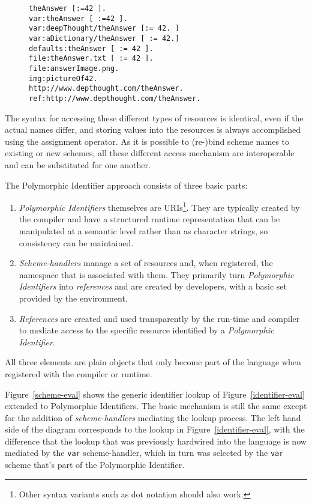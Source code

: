 \documentclass[preprint,authoryear]{llncs}
\begin{document}
\begin{figure}[htbp]
\begin{lstlisting}[style=numbers,label=polymorphic-identifier-examples,caption=Retrieve \mbox{[and store]} values via Polymorphic Identifiers.]
theAnswer [:=42 ].
var:theAnswer [ :=42 ].
var:deepThought/theAnswer [:= 42. ]
var:aDictionary/theAnswer [ := 42.]
defaults:theAnswer [ := 42 ].
file:theAnswer.txt [ := 42 ].
file:answerImage.png.
img:pictureOf42.
http://www.depthought.com/theAnswer.
ref:http://www.depthought.com/theAnswer.
\end{lstlisting}
\end{figure}

The syntax for accessing these different types of resources is identical, even if the actual
names differ, and storing values into the resources is always accomplished using the assignment operator.
As it is possible to (re-)bind scheme names to existing or new schemes, all these different access 
mechanism are interoperable and can be substituted for one another.

The Polymorphic Identifier approach consists of three basic parts:
\begin{enumerate}
\item \emph{Polymorphic Identifiers} themselves are URIs\footnote{Other syntax variants such as dot notation should also work.}.
	  They are typically created by the 
	compiler and have a structured runtime representation that can be manipulated
	at a semantic level rather than as character strings, so consistency can be 
	maintained.
\item \emph{Scheme-handlers} manage a set of resources and, when registered,
	 the namespace that is associated
	with them.  They primarily turn \emph{Polymorphic Identifiers} into \emph{references} and
	are created by developers, with a basic set provided by the environment.
\item \emph{References} are created and used transparently by the run-time and compiler
	to mediate access to the specific resource identified by a \emph{Polymorphic Identifier}.
	
	
\end{enumerate}

All three elements are plain objects that only become part of the language when registered
with the compiler or runtime.

Figure~\ref{scheme-eval} shows the generic identifier lookup of Figure~\ref{identifier-eval}
extended to Polymorphic Identifiers.  The basic mechanism is still the same except for the
addition of \emph{scheme-handlers} mediating the lookup process.  The left hand side of the
diagram corresponds to the lookup in Figure~\ref{identifier-eval}, with the difference that
the lookup that was previously hardwired into the language is now mediated by the {\tt var}
scheme-handler, which in turn was selected by the {\tt var} scheme that's part of the 
Polymorphic Identifier.
\end{document}
